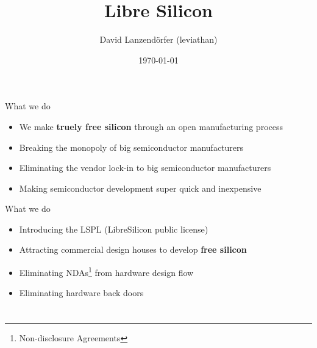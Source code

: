 \documentclass{beamer}
\author{David Lanzendörfer (leviathan)}
\institute{\textit{Lanceville Technologies Group Ltd.}}
\title{Libre Silicon} %
\date{\today} %
\begin{document}
\begin{frame}
\titlepage %
\end{frame}


\section[What]{}
\begin{frame}{What we do}
	\begin{itemize}
        \setlength\itemsep{1em}
		\item We make \textbf{truely free silicon} through an open manufacturing process
		\item Breaking the monopoly of big semiconductor manufacturers
		\item Eliminating the vendor lock-in to big semiconductor manufacturers
		\item Making semiconductor development super quick and inexpensive
	\end{itemize}
\end{frame}
\begin{frame}{What we do}
	\begin{itemize}
        \setlength\itemsep{1em}
		\item Introducing the LSPL (LibreSilicon public license)
		\item Attracting commercial design houses to develop \textbf{free silicon}
		\item Eliminating NDAs\footnote{Non-disclosure Agreements} from hardware design flow
		\item Eliminating hardware back doors
	\end{itemize}
\end{frame}


\section[Why]{}
\end{document}
